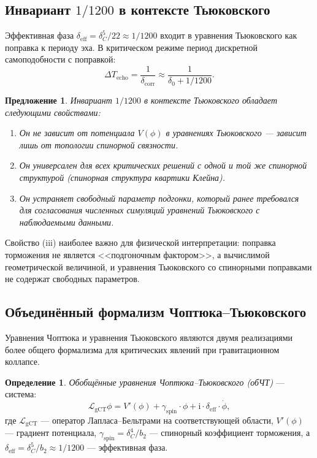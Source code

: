 \documentclass[12pt,a4paper]{article}
\newtheorem{proposition}[theorem]{Предложение}
\theoremstyle{definition}
\newtheorem{definition}[theorem]{Определение}
\theoremstyle{remark}
\newcommand{\cL}{\mathcal{L}}
\newcommand{\ii}{\mathrm{i}}
\begin{document}
\subsection{Инвариант $1/1200$ в контексте Тьюковского}

Эффективная фаза $\delta_{\mathrm{eff}} = \delta_C^5/22 \approx 1/1200$ входит в уравнения Тьюковского как поправка к периоду эха. В критическом режиме период дискретной самоподобности с поправкой:
\begin{equation}
\Delta T_{\mathrm{echo}} = \frac{1}{\delta_{\mathrm{corr}}} \approx \frac{1}{\delta_0 + 1/1200}.
\end{equation}

\begin{proposition}
Инвариант $1/1200$ в контексте Тьюковского обладает следующими свойствами:
\begin{enumerate}[label=(\roman*)]
\item Он не зависит от потенциала $V(\phi)$ в уравнениях Тьюковского --- зависит лишь от топологии спинорной связности.
\item Он универсален для всех критических решений с одной и той же спинорной структурой (спинорная структура квартики Клейна).
\item Он устраняет свободный параметр подгонки, который ранее требовался для согласования численных симуляций уравнений Тьюковского с наблюдаемыми данными.
\end{enumerate}
\end{proposition}

Свойство (iii) наиболее важно для физической интерпретации: поправка торможения не является <<подгоночным фактором>>, а вычислимой геометрической величиной, и уравнения Тьюковского со спинорными поправками не содержат свободных параметров.

\subsection{Объединённый формализм Чоптюка--Тьюковского}

Уравнения Чоптюка и уравнения Тьюковского являются двумя реализациями более общего формализма для критических явлений при гравитационном коллапсе.

\begin{definition}
\emph{Обобщённые уравнения Чоптюка--Тьюковского (обЧТ)} --- система:
\begin{equation}
\cL_{\mathrm{gCT}} \phi = V'(\phi) + \gamma_{\mathrm{spin}} \cdot \phi + \ii \cdot \delta_{\mathrm{eff}} \cdot \dot\phi,
\end{equation}
где $\cL_{\mathrm{gCT}}$ --- оператор Лапласа--Бельтрами на соответствующей области, $V'(\phi)$ --- градиент потенциала, $\gamma_{\mathrm{spin}} = \delta_C^4/b_2$ --- спинорный коэффициент торможения, а $\delta_{\mathrm{eff}} = \delta_C^5/b_2 \approx 1/1200$ --- эффективная фаза.
\end{definition}
\end{document}
